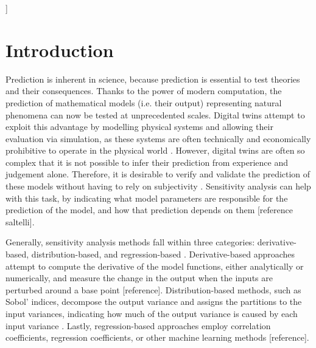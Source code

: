 \documentclass[twocolumn]{rps-esrl2020}
\begin{document}

]

\section{Introduction}

Prediction is inherent in science, because prediction is essential to test theories and their consequences.
Thanks to the power of modern computation, the prediction of mathematical models (i.e. their output) representing natural phenomena can now be tested at unprecedented scales.
Digital twins attempt to exploit this advantage by modelling physical systems and allowing their evaluation via simulation, as these systems are often technically and
economically prohibitive to operate in the physical world \cite{wagg2020digital}.
However, digital twins are often so complex that it is not possible to infer their prediction from experience and judgement alone.
Therefore, it is desirable to verify and validate the prediction of these models without having to rely on subjectivity \cite{JRC122132}.
Sensitivity analysis can help with this task, by indicating what model parameters are responsible for the prediction of the model, and how
that prediction depends on them [reference saltelli].

Generally, sensitivity analysis methods fall within three categories: derivative-based, distribution-based, and regression-based \cite{razavi2021future}.
Derivative-based approaches attempt to compute the derivative of the model functions, either analytically or numerically, and measure the change in
the output when the inputs are perturbed around a base point [reference].
Distribution-based methods, such as Sobol' indices, decompose the output variance and assigns the partitions to the input variances, indicating how much
of the output variance is caused by each input variance \cite{saltelli2010variance}.
Lastly, regression-based approaches employ correlation coefficients, regression coefficients, or other machine learning methods [reference].
\end{document}
